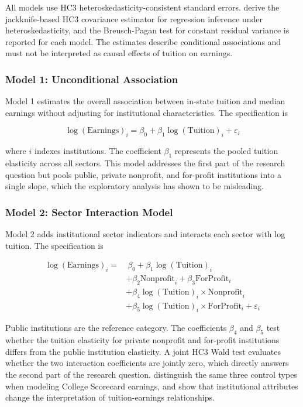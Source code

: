 All models use HC3 heteroskedasticity-consistent standard errors. \textcite[pp.~307--309]{mackinnon1985} derive the jackknife-based HC3 covariance estimator for regression inference under heteroskedasticity, and the Breusch-Pagan test for constant residual variance is reported for each model. The estimates describe conditional associations and must not be interpreted as causal effects of tuition on earnings.

\subsubsection{Model 1: Unconditional Association}

Model 1 estimates the overall association between in-state tuition and median earnings without adjusting for institutional characteristics. The specification is

\[
\log(\text{Earnings})_i = \beta_0 + \beta_1 \log(\text{Tuition})_i + \varepsilon_i
\]

where $i$ indexes institutions. The coefficient $\beta_1$ represents the pooled tuition elasticity across all sectors. This model addresses the first part of the research question but pools public, private nonprofit, and for-profit institutions into a single slope, which the exploratory analysis has shown to be misleading.

\subsubsection{Model 2: Sector Interaction Model}

Model 2 adds institutional sector indicators and interacts each sector with log tuition. The specification is

\[
\begin{aligned}
\log(\text{Earnings})_i = &\ \beta_0 + \beta_1 \log(\text{Tuition})_i \\
&+ \beta_2 \text{Nonprofit}_i + \beta_3 \text{ForProfit}_i \\
&+ \beta_4 \log(\text{Tuition})_i \times \text{Nonprofit}_i \\
&+ \beta_5 \log(\text{Tuition})_i \times \text{ForProfit}_i + \varepsilon_i
\end{aligned}
\]

Public institutions are the reference category. The coefficients $\beta_4$ and $\beta_5$ test whether the tuition elasticity for private nonprofit and for-profit institutions differs from the public institution elasticity. A joint HC3 Wald test evaluates whether the two interaction coefficients are jointly zero, which directly answers the second part of the research question. \textcite[pp.~36, 39]{muse2024} distinguish the same three control types when modeling College Scorecard earnings, and \textcite[pp.~687--700]{faber2021} show that institutional attributes change the interpretation of tuition-earnings relationships.

